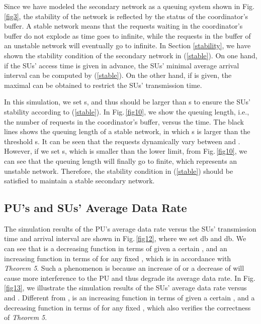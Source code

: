 \documentclass[11pt,draftcls]{IEEEtran}{\onecolumn}
\begin{document}
Since we have modeled the secondary network as a queuing system
shown in Fig.\,\ref{fig3}, the stability of the network is reflected
by the status of the coordinator's buffer. A stable network means
that the requests waiting in the coordinator's buffer do not explode
as time goes to infinite, while the requests in the buffer of an
unstable network will eventually go to infinite. In Section
\ref{stability}, we have shown the stability condition of the
secondary network in (\ref{stable}). On one hand, if the SUs' access
time  is given in advance, the SUs' minimal average arrival
interval  can be computed by (\ref{stable}). On the other
hand, if  is given, the maximal  can be obtained to
restrict the SUs' transmission time.

In this simulation, we set s, and thus 
should be larger than s to ensure the SUs' stability according
to (\ref{stable}). In Fig.\,\ref{fig10}, we show the queuing length,
i.e., the number of requests in the coordinator's buffer, versus the time.
The black lines shows the queuing length of a
stable network, in which s is larger than the threshold
s. It can be seen that the requests dynamically vary between
 and . However, if we set s, which
is smaller than the lower limit, from Fig.\,\ref{fig10}, we can see that the queuing
length will finally go to finite, which represents an unstable
network. Therefore, the stability condition in (\ref{stable}) should
be satisfied to maintain a stable secondary network.

\subsection{PU's and SUs' Average Data Rate}

The simulation results of the PU's average data rate  versus
the SUs' transmission time  and arrival interval 
are shown in Fig.\,\ref{fig12}, where we set
db and
db. We can see that  is a
decreasing function in terms of  given a certain ,
and an increasing function in terms of  for any fixed
, which is in accordance with \emph{Theorem 5}. Such a
phenomenon is because an increase of  or a decrease of
 will cause more interference to the PU and thus degrade
its average data rate. In Fig.\,\ref{fig13}, we illustrate the
simulation results of the SUs' average data rate  versus 
and . Different from ,  is an increasing
function in terms of  given a certain , and a
decreasing function in terms of  for any fixed ,
which also verifies the correctness of \emph{Theorem 5}.
\end{document}
